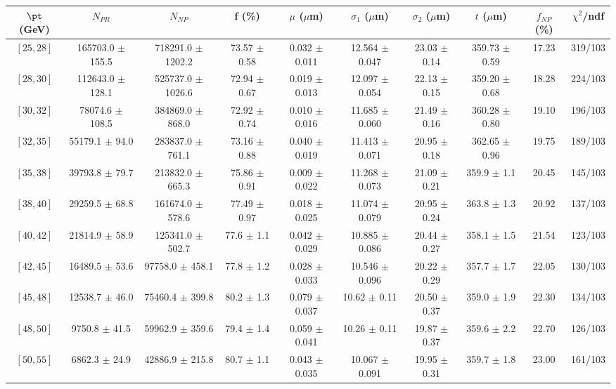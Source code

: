 \begin{tabular}{c||c|c|c|c|c|c|c||c|c}
$\pt$ (GeV) & $N_{PR}$ & $N_{NP}$ & f (\%) & $\mu$ ($\mu$m) & $\sigma_1$ ($\mu$m) & $\sigma_2$ ($\mu$m)  & $t$ ($\mu$m) & $f_{NP}$ (\%) & $\chi^2$/ndf \\
\hline
$[25, 28]$ & 165703.0 $\pm$ 155.5 & 718291.0 $\pm$ 1202.2 & 73.57 $\pm$ 0.58 & 0.032 $\pm$ 0.011 & 12.564 $\pm$ 0.047 & 23.03 $\pm$ 0.14 & 359.73 $\pm$ 0.59 & 17.23 & 319/103\\
$[28, 30]$ & 112643.0 $\pm$ 128.1 & 525737.0 $\pm$ 1026.6 & 72.94 $\pm$ 0.67 & 0.019 $\pm$ 0.013 & 12.097 $\pm$ 0.054 & 22.13 $\pm$ 0.15 & 359.20 $\pm$ 0.68 & 18.28 & 224/103\\
$[30, 32]$ & 78074.6 $\pm$ 108.5 & 384869.0 $\pm$ 868.0 & 72.92 $\pm$ 0.74 & 0.010 $\pm$ 0.016 & 11.685 $\pm$ 0.060 & 21.49 $\pm$ 0.16 & 360.28 $\pm$ 0.80 & 19.10 & 196/103\\
$[32, 35]$ & 55179.1 $\pm$ 94.0 & 283837.0 $\pm$ 761.1 & 73.16 $\pm$ 0.88 & 0.040 $\pm$ 0.019 & 11.413 $\pm$ 0.071 & 20.95 $\pm$ 0.18 & 362.65 $\pm$ 0.96 & 19.75 & 189/103\\
$[35, 38]$ & 39793.8 $\pm$ 79.7 & 213832.0 $\pm$ 665.3 & 75.86 $\pm$ 0.91 & 0.009 $\pm$ 0.022 & 11.268 $\pm$ 0.073 & 21.09 $\pm$ 0.21 & 359.9 $\pm$ 1.1 & 20.45 & 145/103\\
$[38, 40]$ & 29259.5 $\pm$ 68.8 & 161674.0 $\pm$ 578.6 & 77.49 $\pm$ 0.97 & 0.018 $\pm$ 0.025 & 11.074 $\pm$ 0.079 & 20.95 $\pm$ 0.24 & 363.8 $\pm$ 1.3 & 20.92 & 137/103\\
$[40, 42]$ & 21814.9 $\pm$ 58.9 & 125341.0 $\pm$ 502.7 & 77.6 $\pm$ 1.1 & 0.042 $\pm$ 0.029 & 10.885 $\pm$ 0.086 & 20.44 $\pm$ 0.27 & 358.1 $\pm$ 1.5 & 21.54 & 123/103\\
$[42, 45]$ & 16489.5 $\pm$ 53.6 & 97758.0 $\pm$ 458.1 & 77.8 $\pm$ 1.2 & 0.028 $\pm$ 0.033 & 10.546 $\pm$ 0.096 & 20.22 $\pm$ 0.29 & 357.7 $\pm$ 1.7 & 22.05 & 130/103\\
$[45, 48]$ & 12538.7 $\pm$ 46.0 & 75460.4 $\pm$ 399.8 & 80.2 $\pm$ 1.3 & 0.079 $\pm$ 0.037 & 10.62 $\pm$ 0.11 & 20.50 $\pm$ 0.37 & 359.0 $\pm$ 1.9 & 22.30 & 134/103\\
$[48, 50]$ & 9750.8 $\pm$ 41.5 & 59962.9 $\pm$ 359.6 & 79.4 $\pm$ 1.4 & 0.059 $\pm$ 0.041 & 10.26 $\pm$ 0.11 & 19.87 $\pm$ 0.37 & 359.6 $\pm$ 2.2 & 22.70 & 126/103\\
$[50, 55]$ & 6862.3 $\pm$ 24.9 & 42886.9 $\pm$ 215.8 & 80.7 $\pm$ 1.1 & 0.043 $\pm$ 0.035 & 10.067 $\pm$ 0.091 & 19.95 $\pm$ 0.31 & 359.7 $\pm$ 1.8 & 23.00 & 161/103\\

\end{tabular}
